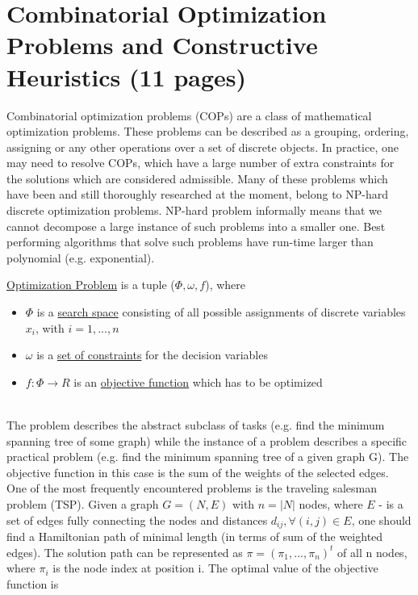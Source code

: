 \section{Combinatorial Optimization Problems and Constructive
Heuristics (11 pages)}

Combinatorial optimization problems (COPs) are a class of mathematical optimization problems. These problems can be described as a grouping, ordering, assigning or any other operations over a set of discrete objects. In practice, one may need to resolve COPs, which have a large number of extra constraints for the solutions which are considered admissible. Many of these problems which have been and still thoroughly researched at the moment, belong to NP-hard discrete optimization problems. NP-hard problem informally means that we cannot decompose a large instance of such problems into a smaller one. Best performing algorithms that solve such problems have run-time larger than polynomial (e.g. exponential).

\begin{minipage}[c, breaklines=true]{0.95\textwidth}
\begin{definition}
	\underline{Optimization Problem} is a tuple ($\Phi,\omega, f$), where
	\begin{itemize}
		\item{$\Phi$ is a \underline{search space} consisting of all possible assignments of discrete variables $x_i$, with $i=1,...,n$ }
		\item{$\omega$ is a \underline{set of constraints} for the decision variables}
		\item{$f:\Phi \to R$ is an \underline{objective function} which has to be optimized}
	\end{itemize}
\end{definition}
\end{minipage} \\

The problem describes the abstract subclass of tasks (e.g. find the minimum spanning tree of some graph) while the instance of a problem describes a specific practical problem (e.g. find the minimum spanning tree of a given graph G). The objective function in this case is the sum of the weights of the selected edges. \\
One of the most frequently encountered problems is the traveling salesman problem (TSP). Given a graph $G=(N,E)$ with $n=|N|$ nodes, where $E$ - is a set of edges fully connecting the nodes and distances $d_{ij}, \forall(i,j) \in E$, one should find a Hamiltonian path of minimal length (in terms of sum of the weighted edges). The solution path can be represented as $\pi=(\pi_1,...,\pi_n)^t$ of all n nodes, where $\pi_i$ is the node index at position i. The optimal value of the objective function is

